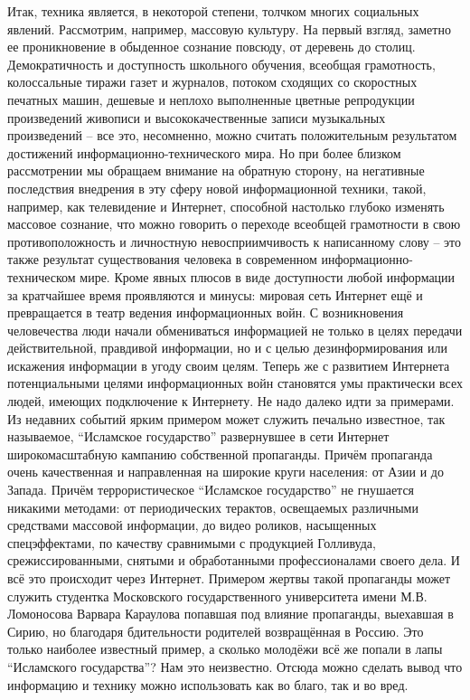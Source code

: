 Итак, техника является, в некоторой степени, толчком многих социальных явлений. Рассмотрим, например, массовую культуру. На первый взгляд, заметно ее проникновение в обыденное сознание повсюду, от деревень до столиц. Демократичность и доступность школьного обучения, всеобщая грамотность, колоссальные тиражи газет и журналов, потоком сходящих со скоростных печатных машин, дешевые и неплохо выполненные цветные репродукции произведений живописи и высококачественные записи музыкальных произведений – все это, несомненно, можно считать положительным результатом достижений информационно-технического мира. Но при более близком рассмотрении мы обращаем внимание на обратную сторону, на негативные последствия внедрения в эту сферу новой информационной техники, такой, например, как телевидение и Интернет, способной настолько глубоко изменять массовое сознание, что можно говорить о переходе всеобщей грамотности в свою противоположность и личностную невосприимчивость к написанному слову – это также результат существования человека в современном информационно-техническом мире. Кроме явных плюсов в виде доступности любой информации за кратчайшее время проявляются и минусы: мировая сеть Интернет ещё и превращается в театр ведения информационных войн. С возникновения человечества люди начали обмениваться информацией не только в целях передачи действительной, правдивой информации, но и с целью дезинформирования или искажения информации в угоду своим целям. Теперь же с развитием Интернета потенциальными целями информационных войн становятся умы практически всех людей, имеющих подключение к Интернету. Не надо далеко идти за примерами. Из недавних событий ярким примером может служить печально известное, так называемое, ``Исламское государство'' развернувшее в сети Интернет широкомасштабную кампанию собственной пропаганды. Причём пропаганда очень качественная и направленная на широкие круги населения: от Азии и до Запада. Причём террористическое ``Исламское государство'' не гнушается никакими методами: от периодических терактов, освещаемых различными средствами массовой информации, до видео роликов, насыщенных спецэффектами, по качеству сравнимыми с продукцией Голливуда, срежиссированными, снятыми и обработанными профессионалами своего дела. И всё это происходит через Интернет. Примером жертвы такой пропаганды может служить студентка Московского государственного университета имени М.В. Ломоносова Варвара Караулова попавшая под влияние пропаганды, выехавшая в Сирию, но благодаря бдительности родителей возвращённая в Россию. Это только наиболее известный пример, а сколько молодёжи всё же попали в лапы ``Исламского государства''? Нам это неизвестно. Отсюда можно сделать вывод что информацию и технику можно использовать как во благо, так и во вред.

